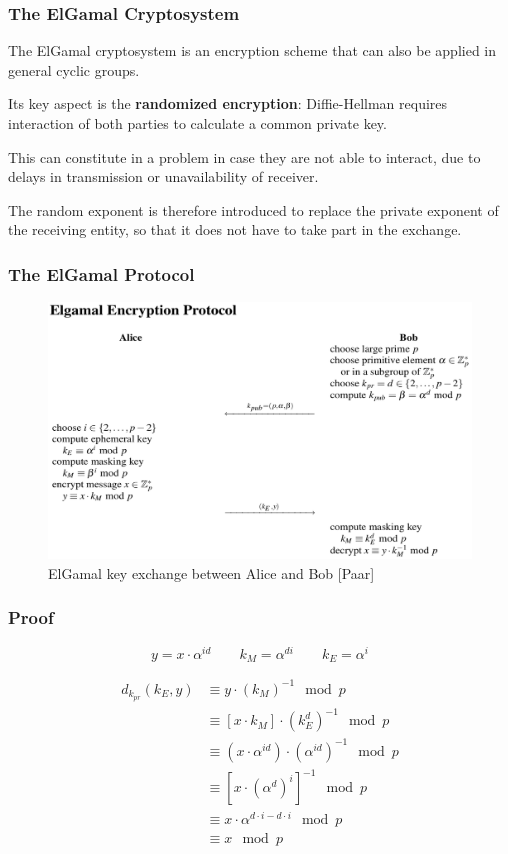 \documentclass{beamer}
\begin{document}
\begin{frame}
\frametitle{The ElGamal Cryptosystem}
The ElGamal cryptosystem is an encryption scheme that can also be applied in general cyclic groups.

Its key aspect is the \textbf{randomized encryption}: Diffie-Hellman requires interaction of both parties to calculate a common private key. 

This can constitute in a problem in case they are not able to interact, due to delays in transmission or unavailability of receiver.

The random exponent is therefore introduced to replace the private exponent of the receiving entity, so that it does not have to take part in the exchange.

\end{frame}


\begin{frame}
\frametitle{The ElGamal Protocol}

\begin{figure}
\includegraphics[width=0.95\linewidth]{ElGamalPaarCropped.png}
\caption{ElGamal key exchange between Alice and Bob [Paar]}
\end{figure}

\end{frame}


\begin{frame}
\frametitle{Proof}
\[y = x \cdot \alpha^{id} \qquad k_M = \alpha^{di} \qquad k_E = \alpha^i \]

\begin{equation}
\begin{split}
d_{k_{pr}}(k_E, y) &\equiv y \cdot (k_M)^{-1} \mod p \\
&\equiv [x \cdot k_M] \cdot (k_E^d)^{-1} \mod p \\
&\equiv (x \cdot \alpha^{id}) \cdot (\alpha^{id})^{-1} \mod p \\
&\equiv [x \cdot (\alpha^d)^i]^{-1} \mod p \\
&\equiv x \cdot \alpha^{d \cdot i - d \cdot i} \mod p \\
&\equiv x \mod p
\end{split}
\end{equation}

\end{frame}
\end{document}

